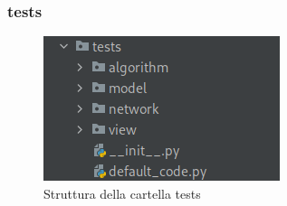 \subsubsection{tests}    
\begin{figure}[H]
    \centering
    \includegraphics[scale = 0.5]{components/img/struttura-cartella-tests.png}
    \caption{Struttura della cartella tests}
    \label{fig:Struttura della cartella tests}
\end{figure}